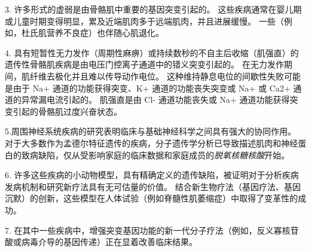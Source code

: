 3. 许多形式的虚弱是由骨骼肌中重要的基因突变引起的。
这些疾病通常在婴儿期或儿童时期变得明显，累及近端肌肉多于远端肌肉，并且进展缓慢。
一些（例如，杜氏肌营养不良症）也伴随心肌退化。


4. 具有短暂性无力发作（周期性麻痹）或持续数秒的不自主后收缩（肌强直）的遗传性骨骼肌疾病是由电压门控离子通道中的错义突变引起的。
在无力发作期间，肌纤维去极化并且难以传导动作电位。
这种维持静息电位的间歇性失败可能是由于 Na+ 通道的功能获得突变、K+ 通道的功能丧失突变或 Na+ 或 Ca2+ 通道的异常漏电流引起的。
肌强直是由 Cl- 通道功能丧失或 Na+ 通道功能获得突变引起的骨骼肌过度兴奋状态。


5.周围神经系统疾病的研究表明临床与基础神经科学之间具有强大的协同作用。
对于大多数作为孟德尔特征遗传的疾病，分子遗传学分析已导致描述肌肉和神经蛋白的致病缺陷，仅从受影响家庭的临床数据和家庭成员的\textit{脱氧核糖核酸}开始。


6. 许多这些疾病的小动物模型，具有精确定义的遗传缺陷，被证明对于分析疾病发病机制和研究新疗法具有无可估量的价值。
结合新生物疗法（基因疗法、基因沉默）的创新，这些模型在人体试验（例如脊髓性肌萎缩症）中取得了变革性的成功。


7. 在其中一些疾病中，增强突变基因功能的新一代分子疗法（例如，反义寡核苷酸或病毒介导的基因传递）正在显着改善临床结果。


